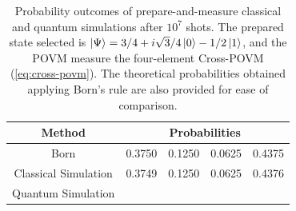 \begin{table}[h!]
\centering
\begin{tabular}{c c c c c} 
 \toprule
 Method & \multicolumn{4}{c}{Probabilities}  \\ \hline
 Born & 0.3750 & 0.1250 & 0.0625 & 0.4375 \\ 
 Classical Simulation & 0.3749 & 0.1250 & 0.0625 & 0.4376 \\ 
 Quantum Simulation & & & & \\ 
 \bottomrule
\end{tabular}
\caption{Probability outcomes of prepare-and-measure classical and quantum simulations after $10^{7}$ shots. The prepared state selected is $\ket{\Psi}=3/4 + i \sqrt{3}/4 \ket{0} - 1/2 \ket{1}$, and the POVM measure the four-element Cross-POVM (\ref{eq:cross-povm}). The theoretical probabilities obtained applying Born’s rule are also
provided for ease of comparison.}
\label{table:classical_quantum_results}
\end{table}